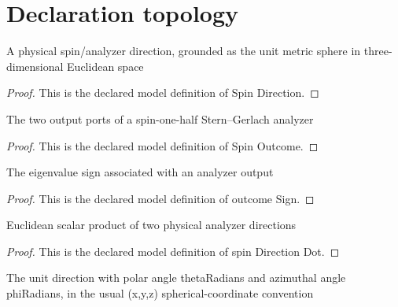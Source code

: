 \section{Declaration topology}
\begin{definition}
  \label{def:physics:phyx-mini-0541:phyxminiproblems-problemphyxmini0541-spindirection}
  A physical spin/analyzer direction, grounded as the unit metric sphere in three-dimensional Euclidean space
\end{definition}
\begin{proof}
  This is the declared model definition of Spin Direction.
\end{proof}
\begin{definition}
  \label{def:physics:phyx-mini-0541:phyxminiproblems-problemphyxmini0541-spinoutcome}
  The two output ports of a spin-one-half Stern--Gerlach analyzer
\end{definition}
\begin{proof}
  This is the declared model definition of Spin Outcome.
\end{proof}
\begin{definition}
  \label{def:physics:phyx-mini-0541:phyxminiproblems-problemphyxmini0541-outcomesign}
  The eigenvalue sign associated with an analyzer output
\end{definition}
\begin{proof}
  This is the declared model definition of outcome Sign.
\end{proof}
\begin{definition}
  \label{def:physics:phyx-mini-0541:phyxminiproblems-problemphyxmini0541-spindirectiondot}
  Euclidean scalar product of two physical analyzer directions
\end{definition}
\begin{proof}
  This is the declared model definition of spin Direction Dot.
\end{proof}
\begin{definition}
  \label{def:physics:phyx-mini-0541:phyxminiproblems-problemphyxmini0541-sphericalspindirection}
  The unit direction with polar angle thetaRadians and azimuthal angle phiRadians, in the usual (x,y,z) spherical-coordinate convention
\end{definition}
